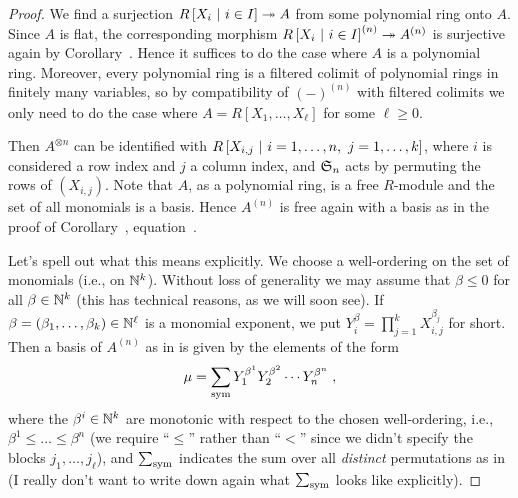 \documentclass[a4paper,parskip=half,numbers=enddot, DIV=12]{scrreprt}
\renewcommand{\geq}{\geqslant}
\renewcommand{\leq}{\leqslant}
\begin{document}
\begin{proof}
	We find a surjection $R\left[X_i\st i\in I\right]\epimorphism A$ from some polynomial ring onto $A$. Since $A$ is flat, the corresponding morphism $R\left[X_i\st i\in I\right]^{(n)}\epimorphism A^{(n)}$ is surjective again by Corollary~. Hence it suffices to do the case where $A$ is a  polynomial ring. Moreover, every polynomial ring is a filtered colimit of polynomial rings in finitely many variables, so by compatibility of $(-)^{(n)}$ with filtered colimits we only need to do the case where $A=R[X_1,\ldots,X_\ell]$ for some $\ell\geq 0$.
	
	Then $A^{\otimes n}$ can be identified with $R\left[X_{i,j}\ \middle|\  i=1,\ldots,n,\ j=1,\ldots,k\right]$, where $i$ is considered a row index and $j$ a column index, and $\mathfrak{S}_n$ acts by permuting the rows of $(X_{i,j})$. Note that $A$, as a polynomial ring, is a free $R$-module and the set of all monomials is a basis. Hence $A^{(n)}$ is free again with a basis as in the proof of Corollary~, equation~.
	
	Let's spell out what this means explicitly. We choose a well-ordering on the set of monomials (i.e., on $\mathbb{N}^k$). Without loss of generality we may assume that $\beta\leq 0$ for all $\beta\in \mathbb{N}^k$ (this has technical reasons, as we will soon see). If $\beta=(\beta_1,\ldots,\beta_k)\in\mathbb{N}^\ell$ is a monomial exponent, we put $Y_i^\beta=\prod_{j=1}^k X_{i,j}^{\beta_j}$ for short. Then a basis of $A^{(n)}$ as in  is given by the elements of the form
	\begin{align}\lbl{eq:HorrorBasis2}
		\mu=\sum_{\sym}Y_1^{\beta^1}Y_2^{\beta^2}\cdots Y_n^{\beta^n}\;,
	\end{align}
	where the $\beta^i\in\mathbb{N}^k$ are monotonic with respect to the chosen well-ordering, i.e., $\beta^1\leq\ldots\leq\beta^n$ (we require ``$\leq$'' rather than ``$<$'' since we didn't specify the blocks $j_1,\ldots,j_\ell$), and $\sum_{\mathrm{sym}}$ indicates the sum over all \emph{distinct} permutations as in  (I really don't want to write down again what $\sum_{\mathrm{sym}}$ looks like explicitly).
	

\end{proof}
\end{document}
